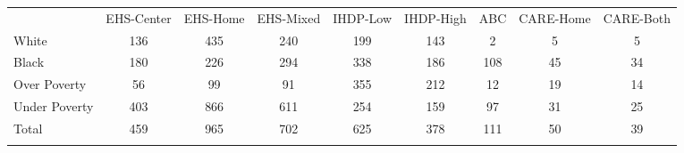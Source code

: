 \begin{tabular}{lcccccccc}
\hline \noalign{\smallskip} & EHS-Center & EHS-Home & EHS-Mixed & IHDP-Low & IHDP-High & ABC & CARE-Home & CARE-Both\\
\noalign{\smallskip}\hline \noalign{\smallskip}White & 136 & 435 & 240 & 199 & 143 & 2 & 5 & 5\\
Black & 180 & 226 & 294 & 338 & 186 & 108 & 45 & 34\\
Over Poverty & 56 & 99 & 91 & 355 & 212 & 12 & 19 & 14\\
Under Poverty & 403 & 866 & 611 & 254 & 159 & 97 & 31 & 25\\
Total & 459 & 965 & 702 & 625 & 378 & 111 & 50 & 39\\
\noalign{\smallskip}\hline\end{tabular}\\
